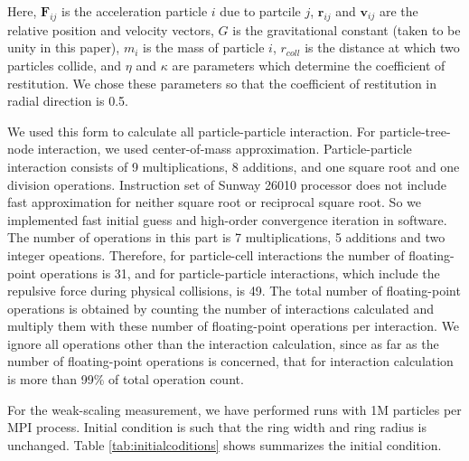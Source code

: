 \documentclass[sigconf]{acmart}
\begin{document}
Here, ${\mathbf F_{ij}}$ is the acceleration particle $i$ due to
partcile $j$, ${\mathbf r_{ij}}$ and ${\mathbf v_{ij}}$ are the
relative position and velocity vectors, $G$ is the gravitational
constant (taken to be unity in this paper), $m_i$ is the mass of
particle $i$,  $r_{coll}$ is the distance at which
two particles collide, and $\eta$ and $\kappa$ are parameters which
determine the coefficient of restitution. We chose these parameters 
so that the coefficient of restitution in radial direction is 0.5.

We used this form to calculate all particle-particle interaction. For
particle-tree-node interaction, we used center-of-mass
approximation. Particle-particle interaction consists of 9
multiplications, 8 additions, and one square root and one division
operations. Instruction set of Sunway 26010 processor does not include
fast approximation for neither square root or reciprocal square
root. So we implemented fast initial guess and high-order
 convergence iteration in software. The number of
operations in this part is 7 multiplications, 5
additions and two integer opeations. Therefore, for particle-cell interactions the number of
floating-point operations is 31, and for particle-particle
interactions, which include the repulsive force during physical
collisions, is 49.  The total number of floating-point operations is
obtained by counting the number of interactions calculated and
multiply them with these number of floating-point operations per
interaction. We ignore all operations other than the interaction
calculation, since as far as the number of floating-point operations is
concerned, that for interaction calculation is more than 99\% of total
operation count.



For the weak-scaling measurement, we have performed runs with
1M particles per MPI process. Initial condition is such that the ring
width and ring radius is unchanged. Table  \ref{tab:initialcoditions} shows
summarizes the initial condition.
\end{document}
